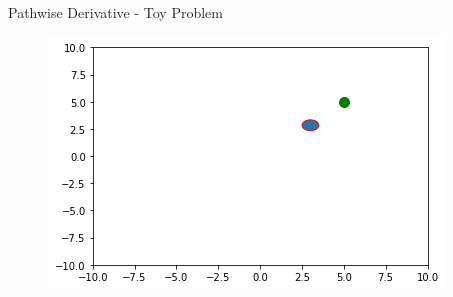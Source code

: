 \begin{frame}[allowframebreaks]{Pathwise Derivative - Toy Problem}
\framebreak

\begin{figure}
		\centering
		\includegraphics[height=0.8\textheight, width=\textwidth, keepaspectratio]{images/vae/toy-problem-4.png}
\end{figure}
\end{frame}